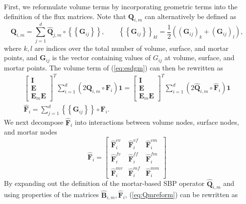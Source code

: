 \documentclass{svjour3}                     %
\renewcommand{\hat}{\widehat}
\newcommand{\LRp}[1]{\left( #1 \right)}
\newcommand{\LRc}[1]{\left\{ #1 \right\}}
\newcommand{\avg}[1] {\ensuremath{\LRc{\!\LRc{#1}\!}}}
\begin{document}
First, we reformulate volume terms by incorporating geometric terms into the definition of the flux matrices.  Note that $\bm{Q}_{i,m}$ can alternatively be defined as \cite{gassner2016split}
\[
\bm{Q}_{i,m} = \sum_{j=1}^d \hat{\bm{Q}}_{j,m} \circ \avg{\bm{G}_{ij}}, \qquad \avg{\bm{G}_{ij}}_{kl} = \frac{1}{2}\LRp{ \LRp{\bm{G}_{ij}}_k + \LRp{\bm{G}_{ij}}_l},
\]
where $k,l$ are indices over the total number of volume, surface, and mortar points, and $\bm{G}_{ij}$ is the vector containing values of $G_{ij}$ at volume, surface, and mortar points.  
The volume term of (\ref{eq:esdgm}) can then be rewritten as
\begin{gather}
\begin{bmatrix} \bm{I} \\ \bm{E} \\ \bm{E}_m\bm{E} \end{bmatrix}^T\sum_{i=1}^d \LRp{2{\bm{Q}}_{i,m} \circ \bm{F}_i}\bm{1} = 
\begin{bmatrix} \bm{I} \\ \bm{E} \\ \bm{E}_m\bm{E} \end{bmatrix}^T\sum_{i=1}^d \LRp{2\hat{\bm{Q}}_{i,m} \circ \hat{\bm{F}}_i}\bm{1} \label{eq:Qmreform}\\
\hat{\bm{F}}_i = \sum_{j=1}^d \avg{\bm{G}_{ij}}\circ \bm{F}_i.\nonumber
\end{gather}
We next decompose $\hat{\bm{F}}_i$ into interactions between volume nodes, surface nodes, and mortar nodes
\[
\hat{\bm{F}}_i = \begin{bmatrix}
\hat{\bm{F}}_i^{vv} & \hat{\bm{F}}_i^{vf} & \hat{\bm{F}}_i^{vm}\\
\hat{\bm{F}}_i^{fv} & \hat{\bm{F}}_i^{ff} & \hat{\bm{F}}_i^{fm}\\
\hat{\bm{F}}_i^{mv} & \hat{\bm{F}}_i^{mf} & \hat{\bm{F}}_i^{mm}
\end{bmatrix}
\]
By expanding out the definition of the mortar-based SBP operator $\hat{\bm{Q}}_{i,m}$ and using properties of the matrices $\hat{\bm{B}}_{i,m}, \hat{\bm{F}}_i$, (\ref{eq:Qmreform}) can be rewritten as
\end{document}
